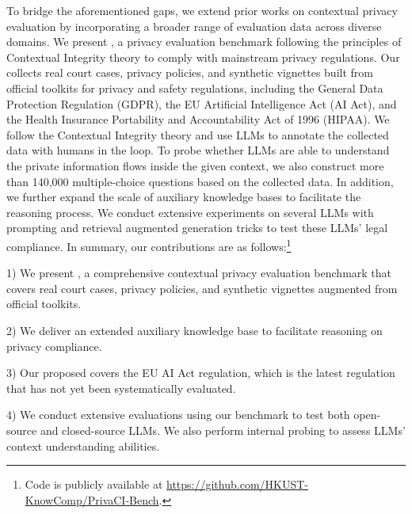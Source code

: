 To bridge the aforementioned gaps, we extend prior works on contextual privacy evaluation by incorporating a broader range of evaluation data across diverse domains.
We present \name, a privacy evaluation benchmark following the principles of  Contextual Integrity theory to comply with mainstream privacy regulations.
Our \name collects real court cases, privacy policies, and synthetic vignettes built from official toolkits for privacy and safety regulations, including the General Data Protection Regulation (GDPR), the EU Artificial Intelligence Act (AI Act), and the Health Insurance Portability and Accountability Act of 1996 (HIPAA).
We follow the Contextual Integrity theory and use LLMs to annotate the collected data with humans in the loop.
To probe whether LLMs are able to understand the private information flows inside the given context, we also construct more than 140,000 multiple-choice questions based on the collected data.
In addition, we further expand the scale of auxiliary knowledge bases to facilitate the reasoning process.
We conduct extensive experiments on several LLMs with prompting and retrieval augmented generation tricks to test these LLMs' legal compliance.
In summary, our contributions are as follows:\footnote{Code is publicly available at \url{https://github.com/HKUST-KnowComp/PrivaCI-Bench}.}

1) We present \name, a comprehensive contextual privacy evaluation benchmark that covers real court cases, privacy policies, and synthetic vignettes augmented from official toolkits.


2) We deliver an extended auxiliary knowledge base to facilitate reasoning on privacy compliance.

3) Our proposed \name covers the EU AI Act regulation, which is the latest regulation that has not yet been systematically evaluated.

4) We conduct extensive evaluations using our benchmark to test both open-source and closed-source LLMs. 
We also perform internal probing to assess LLMs' context understanding abilities.
